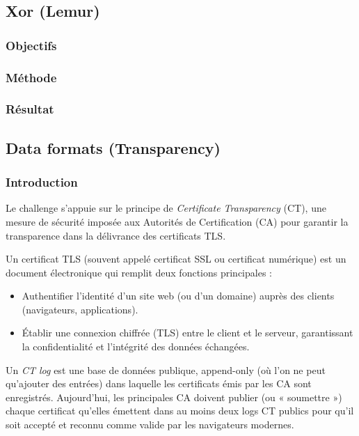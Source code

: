 \documentclass[12pt, a4paper]{article}
\begin{document}
    \subsection{Xor (Lemur)}
        \subsubsection{Objectifs}
        
        \subsubsection{Méthode}
        
        \subsubsection{Résultat}
        
    \subsection{Data formats (Transparency)}
        \subsubsection{Introduction}
            Le challenge s'appuie sur le principe de \emph{Certificate Transparency} (CT), une mesure de sécurité imposée aux Autorités de Certification (CA) pour garantir la transparence dans la délivrance des certificats TLS.
            
            Un certificat TLS (souvent appelé certificat SSL ou certificat numérique) est un document électronique qui remplit deux fonctions principales :
            \begin{itemize}
                \item Authentifier l'identité d'un site web (ou d'un domaine) auprès des clients (navigateurs, applications).
                \item Établir une connexion chiffrée (TLS) entre le client et le serveur, garantissant la confidentialité et l'intégrité des données échangées.
            \end{itemize}
        
            Un \emph{CT log} est une base de données publique, append-only (où l'on ne peut qu'ajouter des entrées) dans laquelle les certificats émis par les CA sont enregistrés. Aujourd'hui, les principales CA doivent publier (ou « soumettre ») chaque certificat qu'elles émettent dans au moins deux logs CT publics pour qu'il soit accepté et reconnu comme valide par les navigateurs modernes.
        
\end{document}
